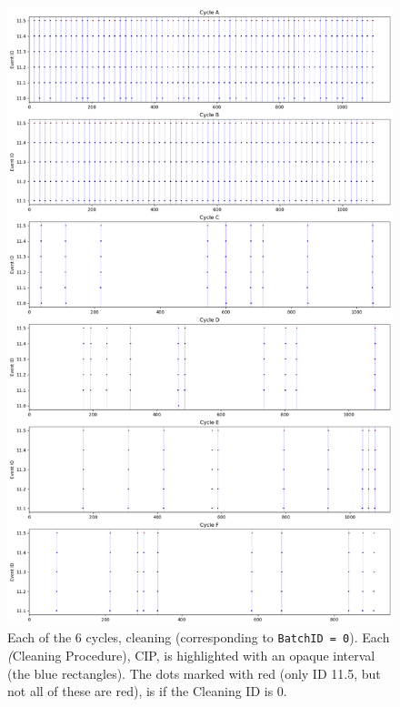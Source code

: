 \documentclass[../Thesis.tex]{subfiles}
\begin{document}
\newpage
\begin{figure}[H]
    \centering
    \includegraphics[width=0.9\linewidth]{figures/Multiple cycles data/Cleaning batches.png}
    \caption{Each of the 6 cycles, cleaning (corresponding to \texttt{BatchID = 0}). Each \textit(Cleaning Procedure), CIP, is highlighted with an opaque interval (the blue rectangles). The dots marked with red (only ID 11.5, but not all of these are red), is if the Cleaning ID is 0.}
    \label{fig:cycle cleaning time series}
\end{figure}
\end{document}
